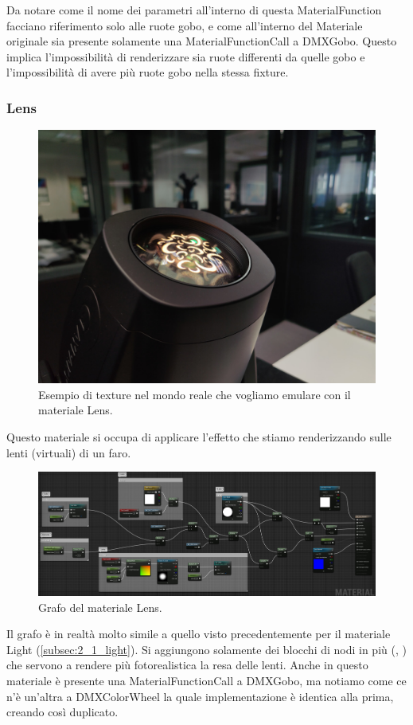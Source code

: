 \documentclass[main.tex]{subfiles}
\begin{document}
Da notare come il nome dei parametri all'interno di questa MaterialFunction facciano riferimento solo alle ruote gobo, e come all'interno del Materiale originale sia presente solamente una MaterialFunctionCall a DMXGobo. Questo implica l'impossibilità di renderizzare sia ruote differenti da quelle gobo e l'impossibilità di avere più ruote gobo nella stessa fixture.

\subsubsection{Lens}\label{subsec:2_1_lens}
\begin{figure}[H]
    \centering
    \includegraphics[width=0.5\linewidth]{img/renderingPipeline/Lens.jpg}
    \caption{Esempio di texture nel mondo reale che vogliamo emulare con il materiale Lens.}
    \label{fig:2_Lens}
\end{figure}
Questo materiale si occupa di applicare l'effetto che stiamo renderizzando sulle lenti (virtuali) di un faro.
\begin{figure}[H]
    \centering
    \includegraphics[width=1\linewidth]{img/renderingPipeline/LensMaterialFull.jpg}
    \caption{Grafo del materiale Lens.}
    \label{fig:2_lensGraphFull}
\end{figure}
\clearpage %
\noindent Il grafo è in realtà molto simile a quello visto precedentemente per il materiale Light (\ref{subsec:2_1_light}). Si aggiungono solamente dei blocchi di nodi in più (, ) che servono a rendere più fotorealistica la resa delle lenti. Anche in questo materiale è presente una MaterialFunctionCall a DMXGobo, ma notiamo come ce n'è un'altra a DMXColorWheel la quale implementazione è identica alla prima, creando così  duplicato.
\end{document}
